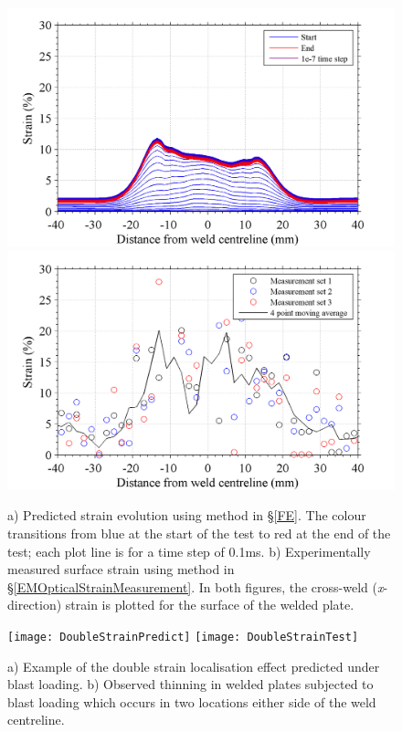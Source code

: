 \begin{figure}[h!]
	\centering
	\includegraphics[width=1\linewidth]{BlastStrainPredictaltered}
	\includegraphics[width=1\linewidth]{BlastStrainaltered}
	\caption[Mesh]{a) Predicted strain evolution using method in \S\ref{FE}. The colour transitions from blue at the start of the test to red at the end of the test; each plot line is for a time step of 0.1ms. b) Experimentally measured surface strain using method in \S\ref{EMOpticalStrainMeasurement}. In both figures, the cross-weld (\textit{x}-direction) strain is plotted for the surface of the welded plate.}
	\label{fig:BlastStrainPredicted}
\end{figure} 
\begin{figure}[h!]
	\centering
	\texttt{[image: DoubleStrainPredict]}
	\texttt{[image: DoubleStrainTest]}
	\caption[Mesh]{a) Example of the double strain localisation effect predicted under blast loading. b) Observed thinning in welded plates subjected to blast loading which occurs in two locations either side of the weld centreline.}
	\label{fig:BlastStrainReality}
\end{figure} 
%


